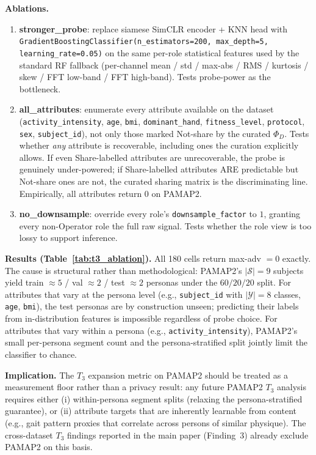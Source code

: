 \documentclass{article}
\theoremstyle{remark}
\begin{document}
\textbf{Ablations.}
\begin{enumerate}
\item \textbf{stronger\_probe}: replace siamese SimCLR encoder + KNN head with \texttt{GradientBoostingClassifier(n\_estimators=200, max\_depth=5, learning\_rate=0.05)} on the same per-role statistical features used by the standard RF fallback (per-channel mean / std / max-abs / RMS / kurtosis / skew / FFT low-band / FFT high-band). Tests probe-power as the bottleneck.
\item \textbf{all\_attributes}: enumerate every attribute available on the dataset (\texttt{activity\_intensity}, \texttt{age}, \texttt{bmi}, \texttt{dominant\_hand}, \texttt{fitness\_level}, \texttt{protocol}, \texttt{sex}, \texttt{subject\_id}), not only those marked Not-share by the curated $\Phi_D$. Tests whether \emph{any} attribute is recoverable, including ones the curation explicitly allows. If even Share-labelled attributes are unrecoverable, the probe is genuinely under-powered; if Share-labelled attributes ARE predictable but Not-share ones are not, the curated sharing matrix is the discriminating line. Empirically, all attributes return $0$ on PAMAP2.
\item \textbf{no\_downsample}: override every role's \texttt{downsample\_factor} to $1$, granting every non-Operator role the full raw signal. Tests whether the role view is too lossy to support inference.
\end{enumerate}

\textbf{Results (Table~\ref{tab:t3_ablation}).} All 180 cells return max-adv $= 0$ exactly. The cause is structural rather than methodological: PAMAP2's $|\mathcal{S}| = 9$ subjects yield train $\approx 5$ / val $\approx 2$ / test $\approx 2$ personas under the $60/20/20$ split. For attributes that vary at the persona level (e.g., \texttt{subject\_id} with $|\mathcal{Y}| = 8$ classes, \texttt{age}, \texttt{bmi}), the test personas are by construction unseen; predicting their labels from in-distribution features is impossible regardless of probe choice. For attributes that vary within a persona (e.g., \texttt{activity\_intensity}), PAMAP2's small per-persona segment count and the persona-stratified split jointly limit the classifier to chance.

\textbf{Implication.} The $T_3$ expansion metric on PAMAP2 should be treated as a measurement floor rather than a privacy result: any future PAMAP2 $T_3$ analysis requires either (i) within-persona segment splits (relaxing the persona-stratified guarantee), or (ii) attribute targets that are inherently learnable from content (e.g., gait pattern proxies that correlate across persons of similar physique). The cross-dataset $T_3$ findings reported in the main paper (Finding~3) already exclude PAMAP2 on this basis.
\end{document}
